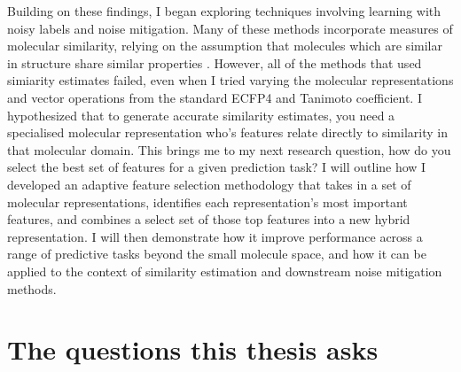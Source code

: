 Building on these findings, I began exploring techniques involving learning with noisy labels and noise mitigation. Many of these methods incorporate measures of molecular similarity, relying on the assumption that molecules which are similar in structure share similar properties \citep{LopezPerez2024}. However, all of the methods that used simiarity estimates failed, even when I tried varying the molecular representations and vector operations from the standard ECFP4 and Tanimoto coefficient. I hypothesized that to generate accurate similarity estimates, you need a specialised molecular representation who's features relate directly to similarity in that molecular domain. This brings me to my next research question, how do you select the best set of features for a given prediction task? I will outline how I developed an adaptive feature selection methodology that takes in a set of molecular representations, identifies each representation's most important features, and combines a select set of those top features into a new hybrid representation. I will then demonstrate how it improve performance across a range of predictive tasks beyond the small molecule space, and how it can be applied to the context of similarity estimation and downstream noise mitigation methods. 


\section{The questions this thesis asks}\label{sec:intro:questions}

